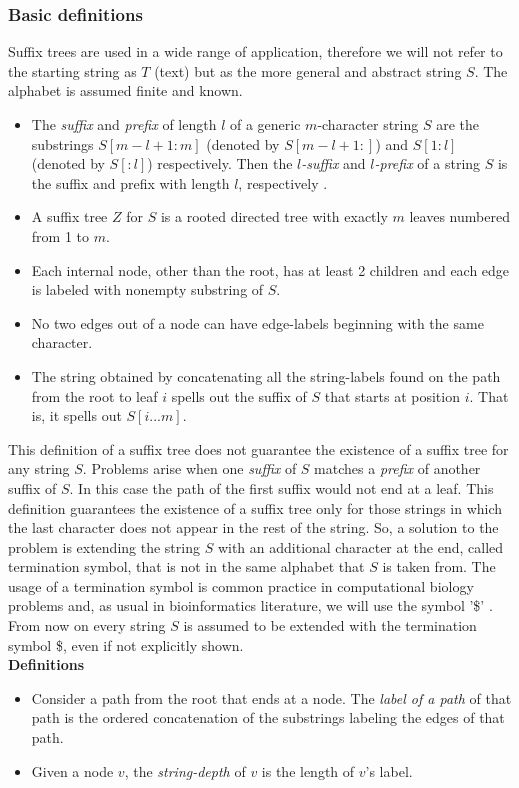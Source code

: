 \documentclass[a4paper,12pt, oneside]{article}
\begin{document}
\subsubsection{Basic definitions}
Suffix trees are used in a wide range of application, therefore we will not refer to the starting string as $T$ (text) but as the more general and abstract string $S$. The alphabet is assumed finite and known.
\begin{itemize}
	\item The \emph{suffix} and \emph{prefix} of length $l$ of a generic $m$-character string $S$ are the substrings $S[m-l +1: m]$ (denoted by $S[m-l +1:]$) and $S[1: l]$ (denoted by $S[:l]$) respectively. Then the \emph{$l$-suffix} and \emph{$l$-prefix} of a string $S$ is the suffix and prefix with length $l$, respectively \cite{paper}.
	\item A suffix tree $Z$ for $S$ is a rooted directed tree with exactly $m$ leaves numbered from 1 to $m$.
	\item Each internal node, other than the root, has at least 2 children and each edge is labeled with nonempty substring of $S$.
	\item No two edges out of a node can have edge-labels beginning with the same character.
	\item The string obtained by concatenating all the string-labels found on the path from the root to leaf $i$ spells out the suffix of $S$ that starts at position $i$. That is, it spells out $S[i...m]$.
\end{itemize}

This definition of a suffix tree does not guarantee the existence of a suffix tree for any string $S$. Problems arise when one \textit{suffix} of $S$ matches a \textit{prefix} of another suffix of $S$. In this case the path of the first suffix would not end at a leaf. This definition guarantees the existence of a suffix tree only for those strings in which the last character does not appear in the rest of the string. So, a solution to the problem is extending the string $S$ with an additional character at the end, called termination symbol, that is not in the same alphabet that $S$ is taken from. The usage of a termination symbol is common practice in computational biology problems and, as usual in bioinformatics literature, we will use the symbol '\$' . From now on every string $S$ is assumed to be extended with the termination symbol \$, even if not explicitly shown.\\

\newpage
\textbf{Definitions}
\begin{itemize}
	\item Consider a path from the root that ends at a node. The \textit{label of a path} of that path is the ordered concatenation of the substrings labeling the edges of that path.
	\item Given a node $v$, the \textit{string-depth} of $v$ is the length of $v$'s label.
\end{itemize}
\end{document}
